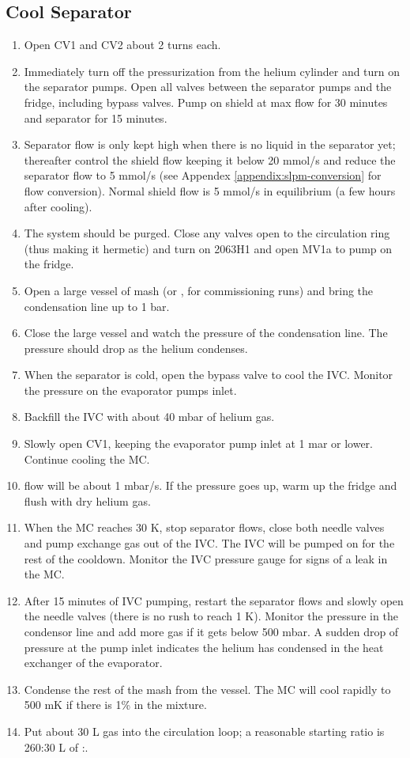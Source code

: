  \subsection{Cool Separator}
 \begin{enumerate}
 \item Open CV1 and CV2 about 2 turns each.
 \item Immediately turn off the pressurization from the helium cylinder and turn on the separator pumps.  Open all valves between the separator pumps and the fridge, including bypass valves.  Pump on shield at max flow for 30 minutes and separator for 15 minutes\cite{tapio-cooldown-procedure}.
 \item Separator flow is only kept high when there is no liquid in the separator yet; thereafter control the shield flow keeping it below 20 mmol/s and reduce the separator flow to 5 mmol/s (see Appendex \ref{appendix:slpm-conversion} for flow conversion).   Normal shield flow is 5 mmol/s in equilibrium (a few hours after cooling).
 \item The \het{} system should be purged.  Close any valves open to the circulation ring (thus making it hermetic) and turn on 2063H1 and open MV1a to pump on the fridge.  
 \item Open a large vessel of mash (or \hef{}, for commissioning runs) and bring the condensation line up to 1 bar.
 \item Close the large vessel and watch the pressure of the condensation line.  The pressure should drop as the helium condenses.
 \item When the separator is cold, open the bypass valve to cool the IVC.  Monitor the pressure on the evaporator pumps inlet.
 \item Backfill the IVC with about 40 mbar of helium gas.
 \item Slowly open CV1, keeping the evaporator pump inlet at 1 mar or lower.  Continue cooling the MC.
 \item \het{} flow will be about 1 mbar/s.  If the pressure goes up, warm up the fridge and flush with dry helium gas.
 \item When the MC reaches 30 K, stop separator flows, close both needle valves and pump exchange gas out of the IVC.  The IVC will be pumped on for the rest of the cooldown.  Monitor the IVC pressure gauge for signs of a leak in the MC.
 \item After 15 minutes of IVC pumping, restart the separator flows and slowly open the needle valves (there is no rush to reach 1 K).  Monitor the pressure in the condensor line and add more gas if it gets below 500 mbar.  A sudden drop of pressure at the \het{} pump inlet indicates the helium has condensed in the heat exchanger of the evaporator.
 \item Condense the rest of the mash from the \het{} vessel.  The MC will cool rapidly to 500 mK if there is 1\% \het{} in the mixture.
 \item Put about 30 L \het{} gas into the circulation loop; a reasonable starting ratio is 260:30 L of \hef:\het.
 
\end{enumerate}


